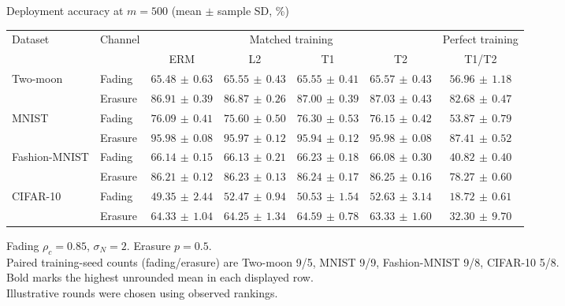 \documentclass[border=4pt]{standalone}
\begin{document}
\begin{minipage}{7.8in}
\centering
Deployment accuracy at $m=500$ (mean $\pm$ sample SD, \%)\\[4pt]
\begin{tabular*}{\linewidth}{@{\extracolsep{\fill}}llccccc@{}}
\toprule
\multirow{2}{*}{Dataset} & \multirow{2}{*}{Channel} & \multicolumn{4}{c}{Matched training} & Perfect training \\
\cmidrule(lr){3-6}\cmidrule(l){7-7}
 & & ERM & L2 & T1 & T2 & T1/T2 \\
\midrule
\multirow{2}{*}{Two-moon} & Fading & $65.48\,\pm\,0.63$ & $65.55\,\pm\,0.43$ & $65.55\,\pm\,0.41$ & $\mathbf{65.57}\,\pm\,0.43$ & $56.96\,\pm\,1.18$ \\
 & Erasure & $86.91\,\pm\,0.39$ & $86.87\,\pm\,0.26$ & $87.00\,\pm\,0.39$ & $\mathbf{87.03}\,\pm\,0.43$ & $82.68\,\pm\,0.47$ \\
\midrule[0.25pt]
\multirow{2}{*}{MNIST} & Fading & $76.09\,\pm\,0.41$ & $75.60\,\pm\,0.50$ & $\mathbf{76.30}\,\pm\,0.53$ & $76.15\,\pm\,0.42$ & $53.87\,\pm\,0.79$ \\
 & Erasure & $95.98\,\pm\,0.08$ & $95.97\,\pm\,0.12$ & $95.94\,\pm\,0.12$ & $\mathbf{95.98}\,\pm\,0.08$ & $87.41\,\pm\,0.52$ \\
\midrule[0.25pt]
\multirow{2}{*}{Fashion-MNIST} & Fading & $66.14\,\pm\,0.15$ & $66.13\,\pm\,0.21$ & $\mathbf{66.23}\,\pm\,0.18$ & $66.08\,\pm\,0.30$ & $40.82\,\pm\,0.40$ \\
 & Erasure & $86.21\,\pm\,0.12$ & $86.23\,\pm\,0.13$ & $86.24\,\pm\,0.17$ & $\mathbf{86.25}\,\pm\,0.16$ & $78.27\,\pm\,0.60$ \\
\midrule[0.25pt]
\multirow{2}{*}{CIFAR-10} & Fading & $49.35\,\pm\,2.44$ & $52.47\,\pm\,0.94$ & $50.53\,\pm\,1.54$ & $\mathbf{52.63}\,\pm\,3.14$ & $18.72\,\pm\,0.61$ \\
 & Erasure & $64.33\,\pm\,1.04$ & $64.25\,\pm\,1.34$ & $\mathbf{64.59}\,\pm\,0.78$ & $63.33\,\pm\,1.60$ & $32.30\,\pm\,9.70$ \\
\bottomrule
\end{tabular*}
\par\smallskip\raggedright\footnotesize
Fading $\rho_c=0.85$, $\sigma_N=2$. Erasure $p=0.5$.\\
Paired training-seed counts (fading/erasure) are Two-moon 9/5, MNIST 9/9, Fashion-MNIST 9/8, CIFAR-10 5/8.\\
Bold marks the highest unrounded mean in each displayed row.\\
Illustrative rounds were chosen using observed rankings.
\end{minipage}
\end{document}
